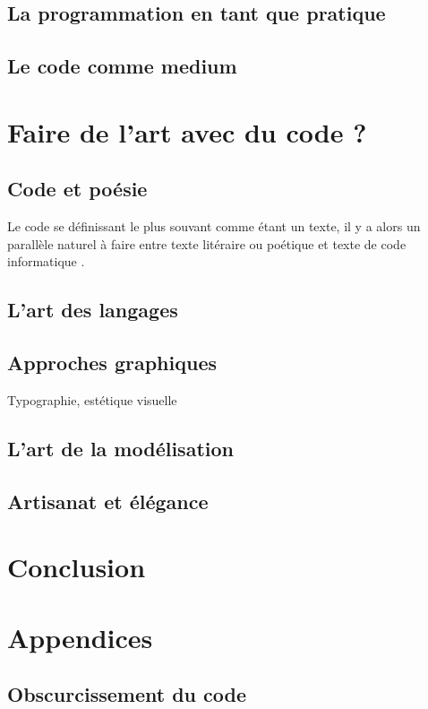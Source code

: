 \documentclass[12pt]{article} %
\begin{document}
\subsection{La programmation en tant que pratique}

\subsection{Le code comme medium}

\section{Faire de l'art avec du code ?}

\subsection{Code et poésie}
Le code se définissant le plus souvant comme étant un texte, il y a alors un parallèle naturel à faire entre texte litéraire ou poétique et texte de code informatique \cite{FCramer2001}.

\subsection{L'art des langages}
\subsection{Approches graphiques}
Typographie, estétique visuelle

\subsection{L'art de la modélisation}
\subsection{Artisanat et élégance}




\section{Conclusion}

\newpage
\section{Appendices}

\subsection{Obscurcissement du code}



\printglossary[type=\acronymtype]

\printglossary


\newpage



\restoregeometry
\end{document}
